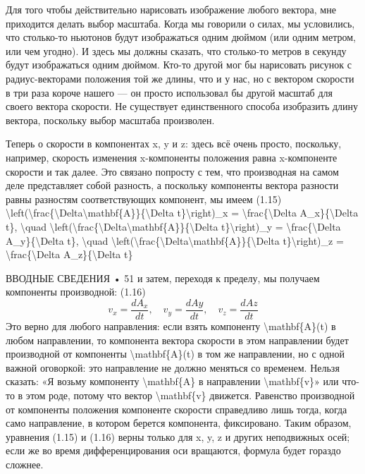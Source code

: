 \documentclass[10pt,oneside]{article}
\begin{document}
Для того чтобы действительно нарисовать изображение любого вектора, мне приходится делать выбор масштаба. Когда мы говорили о силах, мы условились, что столько-то ньютонов будут изображаться одним дюймом (или одним метром, или чем угодно). И здесь мы должны сказать, что столько-то метров в секунду будут изображаться одним дюймом. Кто-то другой мог бы нарисовать рисунок с радиус-векторами положения той же длины, что и у нас, но с вектором скорости в три раза короче нашего --- он просто использовал бы другой масштаб для своего вектора скорости. Не существует единственного способа изобразить длину вектора, поскольку выбор масштаба произволен.\par

Теперь о скорости в компонентах x, y и z: здесь всё очень просто, поскольку, например, скорость изменения x-компоненты положения равна x-компоненте скорости и так далее. Это связано попросту с тем, что производная на самом деле представляет собой разность, а поскольку компоненты вектора разности равны разностям соответствующих компонент, мы имеем (1.15) \textbackslash{}left(\textbackslash{}frac\{\textbackslash{}Delta\textbackslash{}mathbf\{A\}\}\{\textbackslash{}Delta t\}\textbackslash{}right)\_x = \textbackslash{}frac\{\textbackslash{}Delta A\_x\}\{\textbackslash{}Delta t\}, \textbackslash{}quad \textbackslash{}left(\textbackslash{}frac\{\textbackslash{}Delta\textbackslash{}mathbf\{A\}\}\{\textbackslash{}Delta t\}\textbackslash{}right)\_y = \textbackslash{}frac\{\textbackslash{}Delta A\_y\}\{\textbackslash{}Delta t\}, \textbackslash{}quad \textbackslash{}left(\textbackslash{}frac\{\textbackslash{}Delta\textbackslash{}mathbf\{A\}\}\{\textbackslash{}Delta t\}\textbackslash{}right)\_z = \textbackslash{}frac\{\textbackslash{}Delta A\_z\}\{\textbackslash{}Delta t\}\par

ВВОДНЫЕ СВЕДЕНИЯ • 51 и затем, переходя к пределу, мы получаем компоненты производной: (1.16) \[v_x = \frac{dA_x}{dt}, \quad v_y = \frac{dAy}{dt}, \quad v_z = \frac{dAz}{dt}\] Это верно для любого направления: если взять компоненту \textbackslash{}mathbf\{A\}(t) в любом направлении, то компонента вектора скорости в этом направлении будет производной от компоненты \textbackslash{}mathbf\{A\}(t) в том же направлении, но с одной важной оговоркой: это направление не должно меняться со временем. Нельзя сказать: «Я возьму компоненту \textbackslash{}mathbf\{A\} в направлении \textbackslash{}mathbf\{v\}» или что-то в этом роде, потому что вектор \textbackslash{}mathbf\{v\} движется. Равенство производной от компоненты положения компоненте скорости справедливо лишь тогда, когда само направление, в котором берется компонента, фиксировано. Таким образом, уравнения (1.15) и (1.16) верны только для x, y, z и других неподвижных осей; если же во время дифференцирования оси вращаются, формула будет гораздо сложнее.\par
\end{document}
